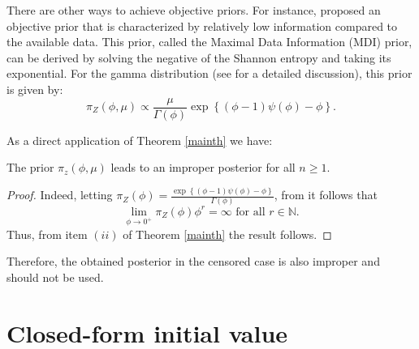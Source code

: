 There are other ways to achieve objective priors. For instance,  \cite{zellner1,zellner2} proposed an objective prior that is characterized by relatively low information compared to the available data. This prior, called the Maximal Data Information (MDI) prior, can be derived by solving the negative of the Shannon entropy and taking its exponential. For the gamma distribution (see  \cite{ramos2020posterior} for a detailed discussion), this prior is given by:
\begin{equation*}%
\pi_Z(\phi, \mu)\propto\frac{\mu}{\Gamma(\phi)}\exp\left\{(\phi-1)\psi(\phi)-\phi\right\}.
\end{equation*}

As a direct application of Theorem \ref{mainth} we have:
\begin{theorem} The prior $\pi_z(\phi,\mu)$ leads to an improper posterior for all $n\geq 1$.
\end{theorem}
\begin{proof} Indeed,  letting $\pi_Z(\phi) = \frac{\exp\left\{(\phi-1)\psi(\phi)-\phi\right\}}{\Gamma(\phi)}$, from \cite{ramos2021posterior} it follows that 
\begin{equation*} \lim_{\phi\to 0^+}\pi_Z(\phi)\phi^r = \infty\mbox{ for all }r\in \mathbb{N}.
\end{equation*}
Thus, from item $(ii)$ of Theorem \ref{mainth} the result follows.
\end{proof}
Therefore, the obtained posterior in the censored case is also improper and should not be used.



\section{Closed-form initial value}

